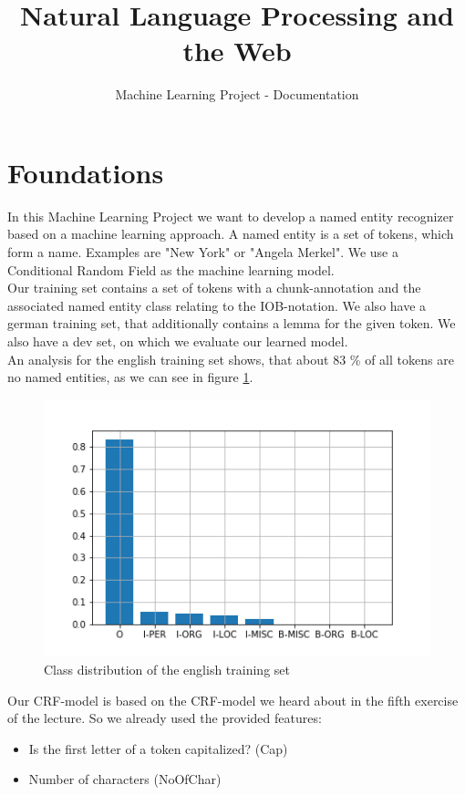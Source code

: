 \documentclass[noindent, nochapname]{tudexercise}
\title{Natural Language Processing and the Web}
\subtitle{Machine Learning Project - Documentation}
\begin{document}
	\lstset{language=Java}
	\maketitle
	
	\section{Foundations}
		In this Machine Learning Project we want to develop a named entity recognizer based on a machine learning approach. A named entity is a set of tokens, which form a name. Examples are "New York" or "Angela Merkel". We use a Conditional Random Field as the machine learning model.\\
		Our training set contains a set of tokens with a chunk-annotation and the associated named entity class relating to the IOB-notation. We also have a german training set, that additionally contains a lemma for the given token. We also have a dev set, on which we evaluate our learned model.\\
		An analysis for the english training set shows, that about 83 \% of all tokens are no named entities, as we can see in figure \ref{fig:class_distribution}.
		
		\begin{figure}[h]
			\centering
			\includegraphics[scale=0.6]{img/class_distribution.png}
			\caption{Class distribution of the english training set}
			\label{fig:class_distribution}
		\end{figure}
		
		Our CRF-model is based on the CRF-model we heard about in the fifth exercise of the lecture. So we already used the provided features:
		\begin{itemize}
			\item Is the first letter of a token capitalized? (Cap)
			
			\item Number of characters (NoOfChar)
		\end{itemize}
		
\end{document}
